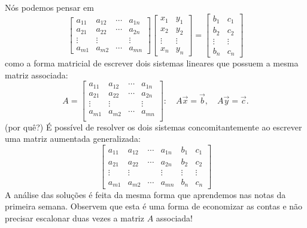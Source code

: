 \documentclass[../livro.tex]{subfiles}  %
\begin{document}
Nós podemos pensar em
\begin{equation}
\left[
\begin{array}{cccc}
a_{11} & a_{12} & \cdots & a_{1n} \\
a_{21} & a_{22} & \cdots & a_{2n} \\
\vdots & \vdots &        & \vdots \\
a_{m1} & a_{m2} & \cdots & a_{mn} 
\end{array}
\right]
\left[
\begin{array}{cc}
x_{1} & y_1 \\
x_{2} & y_2 \\
\vdots & \vdots \\
x_{n} & y_n 
\end{array}
\right] =
\left[
\begin{array}{cc}
b_1 & c_1 \\
b_2 & c_2 \\
\vdots & \vdots \\
b_{n} & c_{n}
\end{array}
\right]
\end{equation} como a forma matricial de escrever dois sistemas lineares que possuem a mesma matriz associada:
\begin{equation}
A =
\left[
\begin{array}{cccc}
a_{11} & a_{12} & \cdots & a_{1n} \\
a_{21} & a_{22} & \cdots & a_{2n} \\
\vdots & \vdots &        & \vdots \\
a_{m1} & a_{m2} & \cdots & a_{mn} \\
\end{array}
\right]: \quad A \vec{x} = \vec{b}, \quad A \vec{y} = \vec{c}.
\end{equation} (por quê?) É possível de resolver os dois sistemas concomitantemente ao escrever uma matriz aumentada generalizada:
\begin{equation}
\left[
\begin{array}{cccc|cc}
a_{11} & a_{12} & \cdots & a_{1n} & b_1 & c_1 \\
a_{21} & a_{22} & \cdots & a_{2n} & b_2 & c_2\\
\vdots & \vdots &        & \vdots  & \vdots & \vdots \\
a_{m1} & a_{m2} & \cdots & a_{mn} & b_{n} & c_{n}
\end{array}
\right]
\end{equation} A análise das soluções é feita da mesma forma que aprendemos nas notas da primeira semana. Observem que esta é uma forma de economizar as contas e não precisar escalonar duas vezes a matriz $A$ associada!
\end{document}
